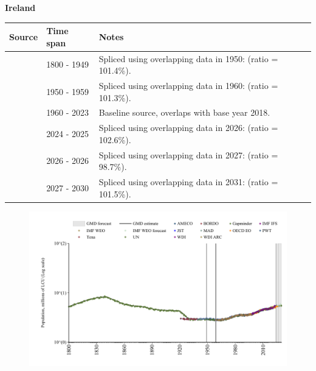 \documentclass[12pt,a4paper,landscape]{article}
\begin{document}
\begin{adjustbox}{max totalsize={\paperwidth}{\paperheight},center}
\begin{minipage}[t][\textheight][t]{\textwidth}
\vspace*{0.5cm}
{}
\begin{center}
{\Large\bfseries Ireland}
\end{center}
\vspace{0.5cm}
\begin{table}[H]
\centering
\small
\begin{tabular}{|l|l|l|}
\hline
\textbf{Source} & \textbf{Time span} & \textbf{Notes} \\
\hline
\rowcolor{white}\cite{Gapminder}& 1800 - 1949 &Spliced using overlapping data in 1950: (ratio = 101.4\%).\\
\rowcolor{lightgray}\cite{IMF_IFS}& 1950 - 1959 &Spliced using overlapping data in 1960: (ratio = 101.3\%).\\
\rowcolor{white}\cite{WDI}& 1960 - 2023 &Baseline source, overlaps with base year 2018.\\
\rowcolor{lightgray}\cite{OECD_EO}& 2024 - 2025 &Spliced using overlapping data in 2026: (ratio = 102.6\%).\\
\rowcolor{white}\cite{AMECO}& 2026 - 2026 &Spliced using overlapping data in 2027: (ratio = 98.7\%).\\
\rowcolor{lightgray}\cite{Gapminder}& 2027 - 2030 &Spliced using overlapping data in 2031: (ratio = 101.5\%).\\
\hline
\end{tabular}
\end{table}
\begin{figure}[H]
\centering
\includegraphics[width=\textwidth,height=0.6\textheight,keepaspectratio]{graphs/IRL_pop.pdf}
\end{figure}
\end{minipage}
\end{adjustbox}
\end{document}
